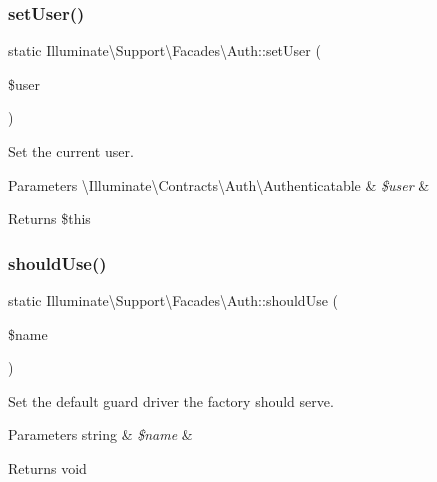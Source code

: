 \subsubsection{\texorpdfstring{set\+User()}{setUser()}}
{\footnotesize\ttfamily static Illuminate\textbackslash{}\+Support\textbackslash{}\+Facades\textbackslash{}\+Auth\+::set\+User (\begin{DoxyParamCaption}\item[{}]{\$user }\end{DoxyParamCaption})\hspace{0.3cm}{\ttfamily [static]}}

Set the current user.


\begin{DoxyParams}[1]{Parameters}
\textbackslash{}\+Illuminate\textbackslash{}\+Contracts\textbackslash{}\+Auth\textbackslash{}\+Authenticatable & {\em \$user} & \\
\hline
\end{DoxyParams}
\begin{DoxyReturn}{Returns}
\$this 
\end{DoxyReturn}
\mbox{\label{class_illuminate_1_1_support_1_1_facades_1_1_auth_acc225c4397c62a6f93d9bd87bba44562}} 
\subsubsection{\texorpdfstring{should\+Use()}{shouldUse()}}
{\footnotesize\ttfamily static Illuminate\textbackslash{}\+Support\textbackslash{}\+Facades\textbackslash{}\+Auth\+::should\+Use (\begin{DoxyParamCaption}\item[{}]{\$name }\end{DoxyParamCaption})\hspace{0.3cm}{\ttfamily [static]}}

Set the default guard driver the factory should serve.


\begin{DoxyParams}[1]{Parameters}
string & {\em \$name} & \\
\hline
\end{DoxyParams}
\begin{DoxyReturn}{Returns}
void 
\end{DoxyReturn}
\mbox{\label{class_illuminate_1_1_support_1_1_facades_1_1_auth_a0e25fe7a8574e495c4e48ee60813f249}} 
